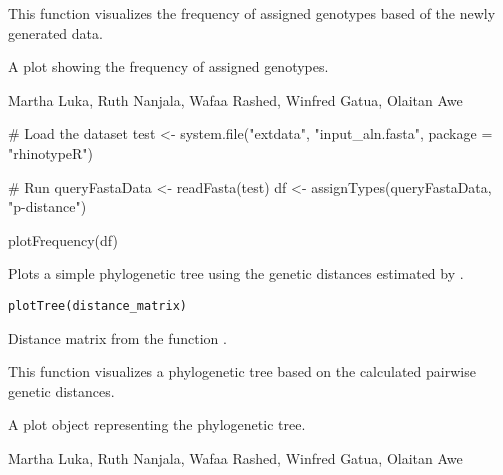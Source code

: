 \documentclass[a4paper]{book}
\begin{document}
%
\begin{Details}
This function visualizes the frequency of assigned genotypes based of the newly generated data.
\end{Details}
%
\begin{Value}
A plot showing the frequency of assigned genotypes.
\end{Value}
%
\begin{Author}
Martha Luka, Ruth Nanjala, Wafaa Rashed, Winfred Gatua, Olaitan Awe 
\end{Author}
%
\begin{SeeAlso}
\end{SeeAlso}
%
\begin{Examples}
\begin{ExampleCode}
# Load the dataset
test <- system.file("extdata", "input_aln.fasta", package = "rhinotypeR")

# Run 
queryFastaData <- readFasta(test)
df <- assignTypes(queryFastaData, "p-distance")

plotFrequency(df)
\end{ExampleCode}
\end{Examples}
%
\begin{Description}
Plots a simple phylogenetic tree using the genetic distances estimated by 
.
\end{Description}
%
\begin{Usage}
\begin{verbatim}
plotTree(distance_matrix)
\end{verbatim}
\end{Usage}
%
\begin{Arguments}
\begin{ldescription}
\item[\code{distance\_matrix}] 
Distance matrix from the function .

\end{ldescription}
\end{Arguments}
%
\begin{Details}
This function visualizes a phylogenetic tree based on the calculated pairwise genetic distances.
\end{Details}
%
\begin{Value}
A plot object representing the phylogenetic tree.
\end{Value}
%
\begin{Author}
Martha Luka, Ruth Nanjala, Wafaa Rashed, Winfred Gatua, Olaitan Awe 
\end{Author}
\end{document}
